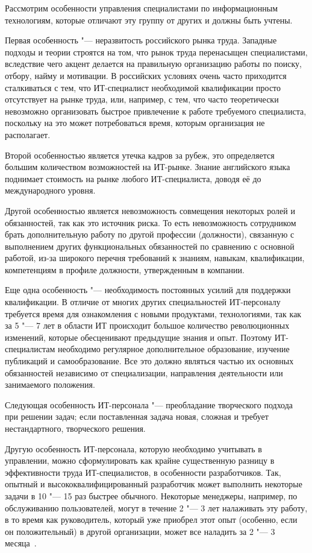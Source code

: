 \documentclass{../industrial-development}
\begin{document}
	\lecturenotes
	
	Рассмотрим особенности управления специалистами по информационным технологиям, которые отличают эту группу от других и должны быть учтены. 
	
	Первая особенность "--- \alert{неразвитость российского рынка труда}. Западные подходы и теории строятся на том, что рынок труда перенасыщен специалистами, вследствие чего акцент делается на правильную организацию работы по поиску, отбору, найму и мотивации. В российских условиях очень часто приходится сталкиваться с тем, что ИТ-специалист необходимой квалификации просто отсутствует на рынке труда, или, например, с тем, что часто теоретически невозможно организовать быстрое привлечение к работе требуемого специалиста, поскольку на это может потребоваться время, которым организация не располагает. 
	
	Второй особенностью является \alert{утечка кадров за рубеж}, это определяется большим количеством возможностей на ИТ-рынке. Знание английского языка поднимает стоимость на рынке любого ИТ-специалиста, доводя её до международного уровня. 
	
	Другой особенностью является \alert{невозможность совмещения некоторых ролей и обязанностей}, так как это источник риска. То есть невозможность сотрудником брать дополнительную работу по другой профессии (должности), связанную с выполнением других функциональных обязанностей по сравнению с основной работой, из-за широкого перечня требований к знаниям, навыкам, квалификации, компетенциям в профиле должности, утвержденным в компании. 
	
	Еще одна особенность "--- \alert{необходимость постоянных усилий для поддержки квалификации}. В отличие от многих других специальностей ИТ-персоналу требуется время для ознакомления с новыми продуктами, технологиями, так как за 5 "--- 7 лет в области ИТ происходит большое количество революционных изменений, которые обесценивают предыдущие знания и опыт. Поэтому ИТ-специалистам необходимо регулярное дополнительное образование, изучение публикаций и самообразование. Все это должно являться частью их основных обязанностей независимо от специализации, направления деятельности или занимаемого положения. 
	
	Следующая особенность ИТ-персонала "--- \alert{преобладание творческого подхода при решении задач}; если поставленная задача новая, сложная и требует нестандартного, творческого решения.
	
	Другую особенность ИТ-персонала, которую необходимо учитывать в управлении, можно сформулировать как \alert{крайне существенную разницу в эффективности труда ИТ-специалистов}, в особенности разработчиков. Так, опытный и высококвалифицированный разработчик может выполнить некоторые задачи в 10 "--- 15 раз быстрее обычного. Некоторые менеджеры, например, по обслуживанию пользователей, могут в течение 2 "--- 3 лет налаживать эту работу, в то время как руководитель, который уже приобрел этот опыт (особенно, если он положительный) в другой организации, может все наладить за 2 "--- 3 месяца~\cite[с.~51--52]{Tutunik}.
	
\end{document}
